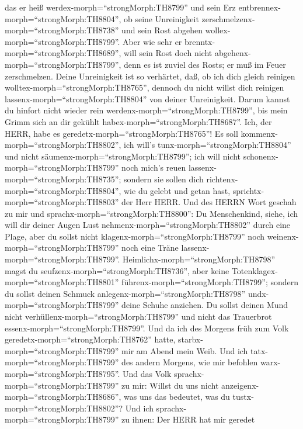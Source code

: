 das er heiß werdex-morph=``strongMorph:TH8799'' und sein Erz
entbrennex-morph=``strongMorph:TH8804'', ob seine Unreinigkeit
zerschmelzenx-morph=``strongMorph:TH8738'' und sein Rost abgehen
wollex-morph=``strongMorph:TH8799''.  Aber wie sehr er
brenntx-morph=``strongMorph:TH8689'', will sein Rost doch nicht
abgehenx-morph=``strongMorph:TH8799'', denn es ist zuviel des Rosts; er
muß im Feuer zerschmelzen.  Deine Unreinigkeit ist so
verhärtet, daß, ob ich dich gleich reinigen
wolltex-morph=``strongMorph:TH8765'', dennoch du nicht willst dich
reinigen lassenx-morph=``strongMorph:TH8804'' von deiner Unreinigkeit.
Darum kannst du hinfort nicht wieder rein
werdenx-morph=``strongMorph:TH8799'', bis mein Grimm sich an dir gekühlt
habex-morph=``strongMorph:TH8687''.  Ich, der HERR, habe es
geredetx-morph=``strongMorph:TH8765''! Es soll
kommenx-morph=``strongMorph:TH8802'', ich will's
tunx-morph=``strongMorph:TH8804'' und nicht
säumenx-morph=``strongMorph:TH8799''; ich will nicht
schonenx-morph=``strongMorph:TH8799'' noch mich's reuen
lassenx-morph=``strongMorph:TH8735''; sondern sie sollen dich
richtenx-morph=``strongMorph:TH8804'', wie du gelebt und getan hast,
sprichtx-morph=``strongMorph:TH8803'' der Herr HERR.  Und
des HERRN Wort geschah zu mir und sprachx-morph=``strongMorph:TH8800'':
 Du Menschenkind, siehe, ich will dir deiner Augen Lust
nehmenx-morph=``strongMorph:TH8802'' durch eine Plage, aber du sollst
nicht klagenx-morph=``strongMorph:TH8799'' noch
weinenx-morph=``strongMorph:TH8799'' noch eine Träne
lassenx-morph=``strongMorph:TH8799''. 
Heimlichx-morph=``strongMorph:TH8798'' magst du
seufzenx-morph=``strongMorph:TH8736'', aber keine
Totenklagex-morph=``strongMorph:TH8801''
führenx-morph=``strongMorph:TH8799''; sondern du sollst deinen Schmuck
anlegenx-morph=``strongMorph:TH8798'' undx-morph=``strongMorph:TH8799''
deine Schuhe anziehen. Du sollst deinen Mund nicht
verhüllenx-morph=``strongMorph:TH8799'' und nicht das Trauerbrot
essenx-morph=``strongMorph:TH8799''.  Und da ich des
Morgens früh zum Volk geredetx-morph=``strongMorph:TH8762'' hatte,
starbx-morph=``strongMorph:TH8799'' mir am Abend mein Weib. Und ich
tatx-morph=``strongMorph:TH8799'' des andern Morgens, wie mir befohlen
warx-morph=``strongMorph:TH8795''.  Und das Volk
sprachx-morph=``strongMorph:TH8799'' zu mir: Willst du uns nicht
anzeigenx-morph=``strongMorph:TH8686'', was uns das bedeutet, was du
tustx-morph=``strongMorph:TH8802''?  Und ich
sprachx-morph=``strongMorph:TH8799'' zu ihnen: Der HERR hat mir geredet
